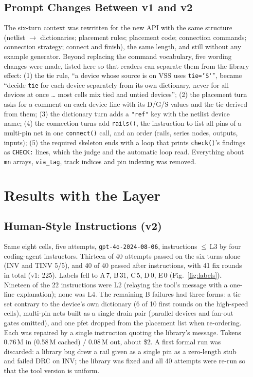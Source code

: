 \documentclass[conference]{IEEEtran}
\newcommand{\code}[1]{\texttt{#1}}
\begin{document}
\subsection{Prompt Changes Between v1 and v2}
\label{sec:prompt}
The six-turn context was rewritten for the new API with the same structure (netlist $\rightarrow$ dictionaries; placement rules; placement code; connection commands; connection strategy; connect and finish), the same length, and still without any example generator. Beyond replacing the command vocabulary, five wording changes were made, listed here so that readers can separate them from the library effect: (1) the tie rule, ``a device whose source is on VSS uses \code{tie='S'}'', became ``decide \code{tie} for each device separately from its own dictionary, never for all devices at once \ldots{} most cells mix tied and untied devices''; (2) the placement turn asks for a comment on each device line with its D/G/S values and the tie derived from them; (3) the dictionary turn adds a \code{"ref"} key with the netlist device name; (4) the connection turns add \code{rails()}, the instruction to list all pins of a multi-pin net in one \code{connect()} call, and an order (rails, series nodes, outputs, inputs); (5) the required skeleton ends with a loop that prints \code{check()}'s findings as \code{CHECK:} lines, which the judge and the automatic loop read. Everything about \code{mn} arrays, \code{via\_tag}, track indices and pin indexing was removed.

\section{Results with the Layer}
\label{sec:results}
\subsection{Human-Style Instructions (v2)}
Same eight cells, five attempts, \code{gpt-4o-2024-08-06}, instructions $\leq$\,L3 by four coding-agent instructors. Thirteen of 40 attempts passed on the six turns alone (INV and TINV 5/5), and 40 of 40 passed after instructions, with 41 fix rounds in total (v1: 225). Labels fell to A\,7, B\,31, C\,5, D\,0, E\,0 (Fig.~\ref{fig:labels}). Nineteen of the 22 instructions were L2 (relaying the tool's message with a one-line explanation); none was L4. The remaining B failures had three forms: a tie set contrary to the device's own dictionary (6 of 10 first rounds on the high-speed cells), multi-pin nets built as a single drain pair (parallel devices and fan-out gates omitted), and one pfet dropped from the placement list when re-ordering. Each was repaired by a single instruction quoting the library's message. Tokens 0.76\,M in (0.58\,M cached) / 0.08\,M out, about \$2. A first formal run was discarded: a library bug drew a rail given as a single pin as a zero-length stub and failed DRC on INV; the library was fixed and all 40 attempts were re-run so that the tool version is uniform.
\end{document}
